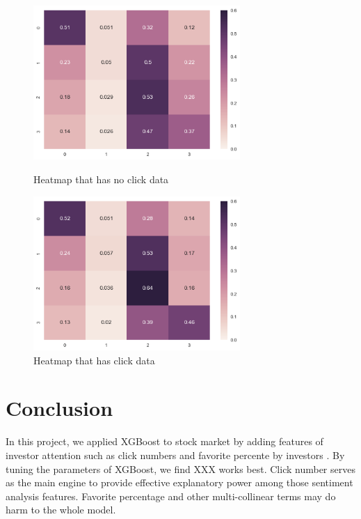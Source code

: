 \documentclass[letterpaper]{article}
\begin{document}
\begin{figure}[htbp]
  \begin{minipage}[t]{0.5\linewidth}
  \centering
  \includegraphics[width=0.7\textwidth]{heatmap_noclick.png}
  \caption{Heatmap that has no click data}
  \end{minipage}
  \begin{minipage}[t]{0.5\linewidth}
  \centering
  \includegraphics[width=0.7\textwidth]{heatmap_hasclick.png}
  \caption{Heatmap that has click data}
  \end{minipage}
\end{figure}


\section{Conclusion}
\label{conclusion}
In this project, we applied XGBoost to stock market by adding features of investor attention such as click numbers and favorite percente by investors . By tuning the parameters of XGBoost, we find XXX works best. Click number serves as the main engine to provide effective explanatory power among those sentiment analysis features. Favorite percentage and other multi-collinear terms may do harm to the whole model. 
\end{document}
